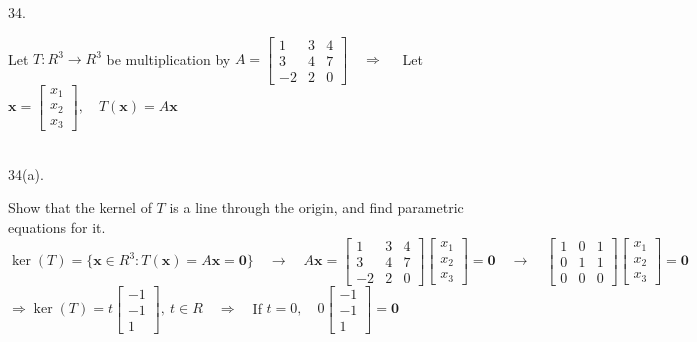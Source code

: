 \documentclass[12pt]{book}
\begin{document}
\begin{CJK}{UTF8}{bsmi}
34. \begin{minipage}[t]{\dimexpr\linewidth-2em}
Let $T:R^3\rightarrow R^3$ be multiplication by $A=\begin{bmatrix}
1 & 3 & 4 \\
3 & 4 & 7 \\
-2& 2 & 0
\end{bmatrix}\quad\Rightarrow\quad$ Let $\textbf{x}=\begin{bmatrix}
x_1 \\ x_2 \\ x_3
\end{bmatrix},\quad T(\textbf{x})=A\textbf{x}$
\end{minipage}\\

34(a). \begin{minipage}[t]{\dimexpr\linewidth-2em}
Show that the kernel of $T$ is a line through the origin, and find parametric equations for it. \\
$\ker(T)=\{\textbf{x}\in R^3:T(\textbf{x})=A\textbf{x}=\textbf{0}\}\quad\rightarrow\quad A\textbf{x}=\begin{bmatrix}
1 & 3 & 4 \\
3 & 4 & 7 \\
-2& 2 & 0
\end{bmatrix}\begin{bmatrix}
x_1 \\ x_2 \\ x_3
\end{bmatrix}=\textbf{0}\quad\rightarrow\quad\begin{bmatrix}
1 & 0 & 1 \\
0 & 1 & 1 \\
0 & 0 & 0 
\end{bmatrix}\begin{bmatrix}
x_1 \\ x_2 \\ x_3
\end{bmatrix}=\textbf{0}$ \\
$\Rightarrow \ker(T)=t\begin{bmatrix}
-1 \\ -1 \\ 1
\end{bmatrix},\ t\in R\quad\Rightarrow\quad$If $t=0,\quad0\begin{bmatrix}
-1 \\ -1 \\ 1
\end{bmatrix}=\textbf{0}$
\end{minipage}\\


\end{CJK}
\end{document}
